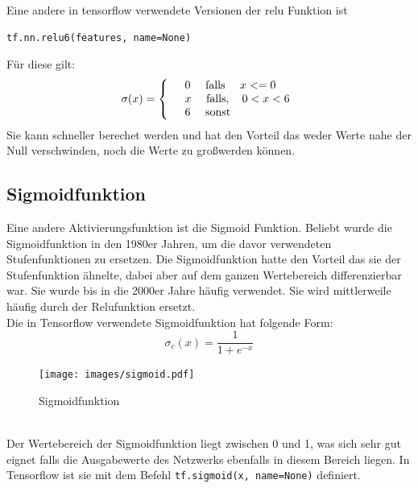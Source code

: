 Eine andere in tensorflow verwendete Versionen der relu Funktion ist \cite{cookbook}
\begin{lstlisting}
tf.nn.relu6(features, name=None)
\end{lstlisting}
Für diese gilt:
\begin{align*}
	\sigma(x)=
	\left\{
	\begin{array}{l l}
		& 0 \quad \text{   falls  } \quad x <= 0  \\ 
		& x \quad \text{   falls},\quad 0 < x < 6 \\
		& 6 \quad \text{   sonst}
	\end{array}
	\right.
\end{align*}
Sie kann schneller berechet werden und hat den Vorteil das weder Werte nahe der Null verschwinden, noch die Werte zu gro\ss werden können.\cite{cookbook} 
\subsection{Sigmoidfunktion}
Eine andere Aktivierungsfunktion ist die Sigmoid Funktion. Beliebt wurde die Sigmoidfunktion in den 1980er Jahren, um die davor verwendeten Stufenfunktionen zu ersetzen. Die Sigmoidfunktion hatte den Vorteil das sie der Stufenfunktion ähnelte, dabei aber auf dem ganzen Wertebereich differenzierbar war. Sie wurde bis in die 2000er Jahre häufig verwendet. Sie wird mittlerweile häufig durch der Relufunktion ersetzt. \cite{Goodfellow} \\
Die in Tensorflow verwendete Sigmoidfunktion hat folgende Form:\cite{cookbook}
\begin{equation}
\sigma_c(x)=\frac{1}{1+e^{-x}}
\end{equation}
\begin{figure}[!htp]
	\centering
	\texttt{[image: images/sigmoid.pdf]}
	\caption{Sigmoidfunktion \cite{building}}
\end{figure}\\
Der Wertebereich der Sigmoidfunktion liegt zwischen 0 und 1, was sich sehr gut eignet falls die Ausgabewerte des Netzwerks ebenfalls in diesem Bereich liegen. In Tensorflow ist sie mit dem Befehl \lstinline$tf.sigmoid(x, name=None)$\cite{building}
definiert.
